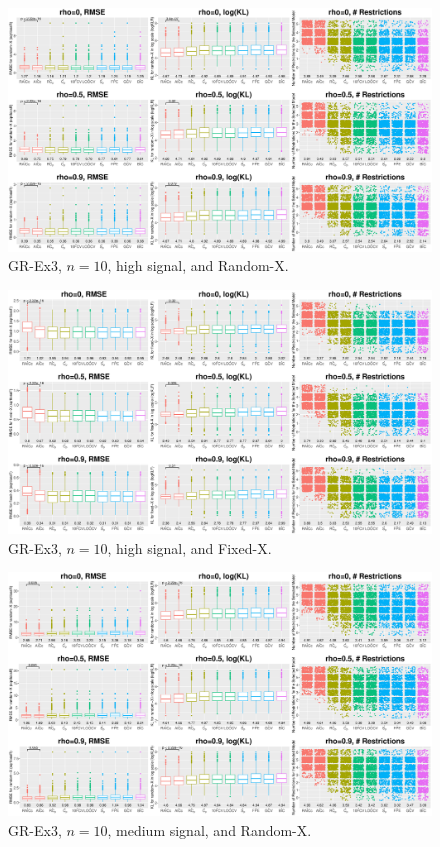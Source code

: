 \clearpage
\begin{figure}[!ht]
\centering
\includegraphics[width=\textwidth]{figures/supplement/randomx_GR-Ex3_n10_hsnr.eps}
\caption{GR-Ex3, $n=10$, high signal, and Random-X.}
\end{figure}
\begin{figure}[!ht]
\centering
\includegraphics[width=\textwidth]{figures/supplement/fixedx_GR-Ex3_n10_hsnr.eps}
\caption{GR-Ex3, $n=10$, high signal, and Fixed-X.}
\end{figure}
\clearpage
\begin{figure}[!ht]
\centering
\includegraphics[width=\textwidth]{figures/supplement/randomx_GR-Ex3_n10_msnr.eps}
\caption{GR-Ex3, $n=10$, medium signal, and Random-X.}
\end{figure}
